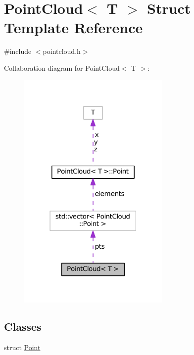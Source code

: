 \hypertarget{struct_point_cloud}{\section{Point\-Cloud$<$ T $>$ Struct Template Reference}
\label{struct_point_cloud}
}


{\ttfamily \#include $<$pointcloud.\-h$>$}



Collaboration diagram for Point\-Cloud$<$ T $>$\-:\nopagebreak
\begin{figure}[H]
\begin{center}
\leavevmode
\includegraphics[width=210pt]{struct_point_cloud__coll__graph}
\end{center}
\end{figure}
\subsection*{Classes}
\begin{DoxyCompactItemize}
\item 
struct \hyperlink{struct_point_cloud_1_1_point}{Point}
\end{DoxyCompactItemize}
